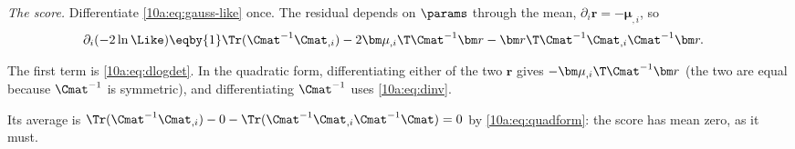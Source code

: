 \emph{The score.} Differentiate \eqref{10a:eq:gauss-like} once. The residual depends on $\params$ through the mean,
$\partial_i\bm r=-\bm\mu_{,i}$, so
\begin{align}
  \partial_i(-2\ln\Like)
  &\eqby{1}\Tr(\Cmat^{-1}\Cmat_{,i})-2\bm\mu_{,i}\T\Cmat^{-1}\bm r-\bm r\T\Cmat^{-1}\Cmat_{,i}\Cmat^{-1}\bm r .
  \label{10a:eq:gauss-score}
\end{align}
\begin{explain}
  \item The first term is \eqref{10a:eq:dlogdet}. In the quadratic form, differentiating either of the two
        $\bm r$ gives $-\bm\mu_{,i}\T\Cmat^{-1}\bm r$ (the two are equal because $\Cmat^{-1}$ is symmetric), and
        differentiating $\Cmat^{-1}$ uses \eqref{10a:eq:dinv}.
\end{explain}
Its average is $\Tr(\Cmat^{-1}\Cmat_{,i})-0-\Tr(\Cmat^{-1}\Cmat_{,i}\Cmat^{-1}\Cmat)=0$ by
\eqref{10a:eq:quadform}: the score has mean zero, as it must.

